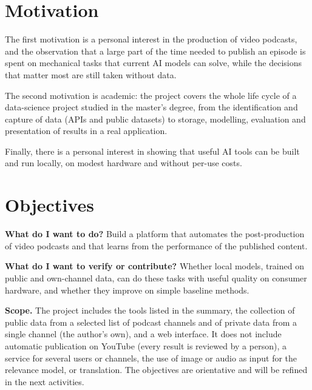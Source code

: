 \documentclass[ENG]{TFUOC}
\begin{document}
\section{Motivation}

The first motivation is a personal interest in the production of video podcasts, and the observation that a large part of the time needed to publish an episode is spent on mechanical tasks that current AI models can solve, while the decisions that matter most are still taken without data.

The second motivation is academic: the project covers the whole life cycle of a data-science project studied in the master's degree, from the identification and capture of data (APIs and public datasets) to storage, modelling, evaluation and presentation of results in a real application.

Finally, there is a personal interest in showing that useful AI tools can be built and run locally, on modest hardware and without per-use costs.

\section{Objectives}

\textbf{What do I want to do?} Build a platform that automates the post-production of video podcasts and that learns from the performance of the published content.

\textbf{What do I want to verify or contribute?} Whether local models, trained on public and own-channel data, can do these tasks with useful quality on consumer hardware, and whether they improve on simple baseline methods.

\textbf{Scope.} The project includes the tools listed in the summary, the collection of public data from a selected list of podcast channels and of private data from a single channel (the author's own), and a web interface. It does not include automatic publication on YouTube (every result is reviewed by a person), a service for several users or channels, the use of image or audio as input for the relevance model, or translation. The objectives are orientative and will be refined in the next activities.
\end{document}
